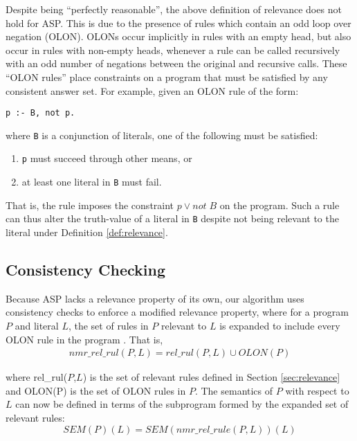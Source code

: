 \documentclass{new_tlp}
\begin{document}
Despite being ``perfectly reasonable'', the above definition of relevance does
not hold for ASP. This is due to the presence of rules which contain an odd
loop over negation (OLON). OLONs occur implicitly in rules with an empty head,
but also occur in rules with non-empty heads, whenever a rule can be called
recursively with an odd number of negations between the original and recursive
calls. These ``OLON rules'' place constraints on a program that must be
satisfied by any consistent answer set. For example, given an OLON rule of the
form:
\begin{verbatim}
p :- B, not p.
\end{verbatim}
where \texttt{B} is a conjunction of literals, one of the following 
must be satisfied:
\begin{enumerate}
\item \texttt{p} must succeed through other means, or
\item at least one literal in \texttt{B} must fail.
\end{enumerate}
That is, the rule imposes the constraint $p \vee not\;B$ on the program. Such a
rule can thus alter the truth-value of a literal in \texttt{B} despite not
being relevant to the literal under Definition \ref{def:relevance}.


\subsection{Consistency Checking} \label{sec:consistency}

Because ASP lacks a relevance property of its own, our algorithm uses
consistency checks to enforce a modified relevance property, where for a
program $P$ and literal $L$, the set of rules in $P$ relevant to $L$ is
expanded to include every OLON rule in the program \cite{goalasp}. That is,
\begin{equation} \label{eq:nmrrelrule}
\begin{aligned}
nmr\_rel\_rul(P,L) = rel\_rul(P,L) \cup OLON(P)
\end{aligned}
\end{equation}

\noindent where rel\_rul($P$,$L$) is the set of relevant rules defined in 
Section \ref{sec:relevance} and OLON(P) is the set of OLON rules in $P$. The 
semantics of $P$ with respect to $L$ can now be defined in terms of the
subprogram formed by the expanded set of relevant rules:
\begin{equation}
\label{eq:nmrrel}
SEM(P)(L) = SEM(nmr\_rel\_rule(P,L))(L)
\end{equation}
\end{document}
